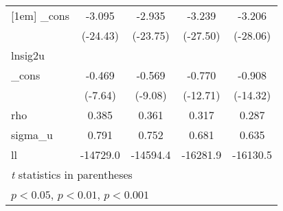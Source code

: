 {\begin{tabular}{l*{4}{c}}
[1em]
\_cons      &      -3.095\sym{***}&      -2.935\sym{***}&      -3.239\sym{***}&      -3.206\sym{***}\\
            &    (-24.43)         &    (-23.75)         &    (-27.50)         &    (-28.06)         \\
\hline
lnsig2u     &                     &                     &                     &                     \\
\_cons      &      -0.469\sym{***}&      -0.569\sym{***}&      -0.770\sym{***}&      -0.908\sym{***}\\
            &     (-7.64)         &     (-9.08)         &    (-12.71)         &    (-14.32)         \\
\hline
rho         &       0.385         &       0.361         &       0.317         &       0.287         \\
sigma\_u     &       0.791         &       0.752         &       0.681         &       0.635         \\
ll          &    -14729.0         &    -14594.4         &    -16281.9         &    -16130.5         \\
\hline\hline
\multicolumn{5}{l}{\footnotesize \textit{t} statistics in parentheses}\\
\multicolumn{5}{l}{\footnotesize \sym{*} \(p<0.05\), \sym{**} \(p<0.01\), \sym{***} \(p<0.001\)}\\
\end{tabular}
}
